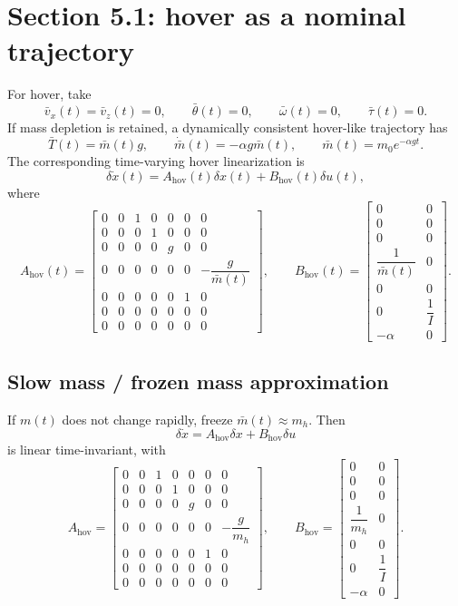 \documentclass[10pt]{article}
\newcommand{\dd}{\delta}
\newcommand{\thb}{\bar\theta}
\newcommand{\mb}{\bar m}
\newcommand{\Tb}{\bar T}
\newcommand{\eps}{\omega}
\newcommand{\vphi}{\alpha}
\begin{document}
\section{Section 5.1: hover as a nominal trajectory}
For hover, take
\[
    \bar v_x(t)=\bar v_z(t)=0,
    \qquad
    \thb(t)=0,
    \qquad
    \bar\eps(t)=0,
    \qquad
    \bar\tau(t)=0.
\]
If mass depletion is retained, a dynamically consistent hover-like trajectory has
\[
    \Tb(t)=\mb(t)g,
    \qquad
    \dot{\mb}(t)=-\vphi g\mb(t),
    \qquad
    \mb(t)=m_0e^{-\vphi gt}.
\]
The corresponding time-varying hover linearization is
\[
    \dd\dot x(t)=A_{\mathrm{hov}}(t)\dd x(t)+B_{\mathrm{hov}}(t)\dd u(t),
\]
where
{\small
\[
A_{\mathrm{hov}}(t)=
\begin{bmatrix}
0&0&1&0&0&0&0\\
0&0&0&1&0&0&0\\
0&0&0&0&g&0&0\\
0&0&0&0&0&0&-\dfrac{g}{\mb(t)}\\
0&0&0&0&0&1&0\\
0&0&0&0&0&0&0\\
0&0&0&0&0&0&0
\end{bmatrix},
\qquad
B_{\mathrm{hov}}(t)=
\begin{bmatrix}
0&0\\
0&0\\
0&0\\
\dfrac{1}{\mb(t)}&0\\
0&0\\
0&\dfrac{1}{I}\\
-\vphi&0
\end{bmatrix}.
\]
}

\subsection*{Slow mass / frozen mass approximation}
If $m(t)$ does not change rapidly, freeze $\mb(t)\approx m_h$. Then
\[
    \boxed{\dd\dot x=A_{\mathrm{hov}}\dd x+B_{\mathrm{hov}}\dd u}
\]
is linear time-invariant, with
{\small
\[
A_{\mathrm{hov}}=
\begin{bmatrix}
0&0&1&0&0&0&0\\
0&0&0&1&0&0&0\\
0&0&0&0&g&0&0\\
0&0&0&0&0&0&-\dfrac{g}{m_h}\\
0&0&0&0&0&1&0\\
0&0&0&0&0&0&0\\
0&0&0&0&0&0&0
\end{bmatrix},
\qquad
B_{\mathrm{hov}}=
\begin{bmatrix}
0&0\\
0&0\\
0&0\\
\dfrac{1}{m_h}&0\\
0&0\\
0&\dfrac{1}{I}\\
-\vphi&0
\end{bmatrix}.
\]
}
\end{document}
